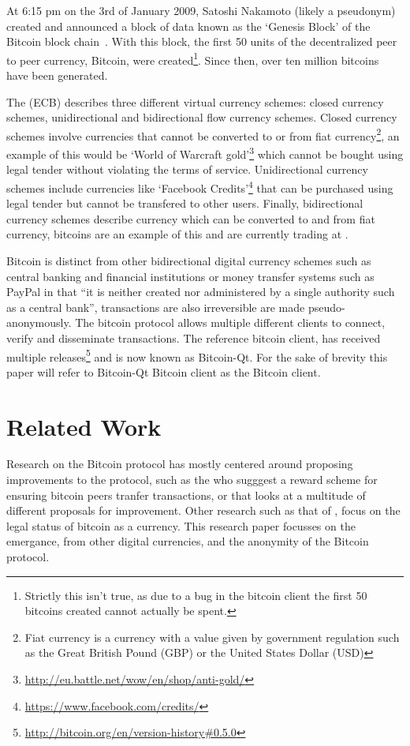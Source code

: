 At 6:15 pm on the 3rd of January 2009, Satoshi Nakamoto (likely a pseudonym) created and announced a block of data known as the `Genesis Block' of the Bitcoin block chain~\cite{satoshi}. With this block, the first 50 units of the decentralized peer to peer currency, Bitcoin, were created\footnote{Strictly this isn't true, as due to a bug in the bitcoin client the first 50 bitcoins created cannot actually be spent.}. Since then, over ten million bitcoins have been generated.

The \textcite{euro-currency-schemes} (ECB) describes three different virtual currency schemes: closed currency schemes, unidirectional and bidirectional flow currency schemes.  Closed currency schemes involve currencies that cannot be converted to or from fiat currency\footnote{Fiat currency is a currency with a value given by government regulation such as the Great British Pound (GBP) or the United States Dollar (USD)}, an example of this would be `World of Warcraft gold'\footnote{\url{http://eu.battle.net/wow/en/shop/anti-gold/}} which cannot be bought using legal tender without violating the terms of service.  Unidirectional currency schemes include currencies like `Facebook Credits'\footnote{\url{https://www.facebook.com/credits/}} that can be purchased using legal tender but cannot be transfered to other users.  Finally, bidirectional currency schemes describe currency which can be converted to and from fiat currency, bitcoins are an example of this and are currently trading at .

Bitcoin is distinct from other bidirectional digital currency schemes such as central banking and financial institutions or money transfer systems such as PayPal\cite{paypal} in that ``it is neither created nor administered by a single authority such as a central bank''\cite{why-interesting}, transactions are also irreversible are made pseudo-anonymously. The bitcoin protocol allows multiple different clients to connect, verify and disseminate transactions.  The reference bitcoin client, has received multiple releases\footnote{\url{http://bitcoin.org/en/version-history\#0.5.0}} and is now known as Bitcoin-Qt\cite{bitcoin-qt}. For the sake of brevity this paper will refer to Bitcoin-Qt Bitcoin client as the Bitcoin client.

\section{Related Work}
Research on the Bitcoin protocol has mostly centered around proposing improvements to the protocol, such as the \textcite{red-balloons} who sugggest a reward scheme for ensuring bitcoin peers tranfer transactions, or \textcite{bitter-to-better} that looks at a multitude of different proposals for improvement.  Other research such as that of \textcite{legal}, focus on the legal status of bitcoin as a currency.  This research paper focusses on the emergance, from other digital currencies, and the anonymity of the Bitcoin protocol.


